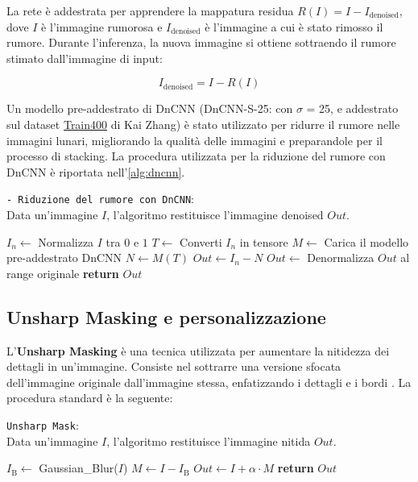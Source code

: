 La rete è addestrata per apprendere la mappatura residua $R(I) = I - I_{\text{denoised}}$, dove $I$ è l'immagine rumorosa e $I_{\text{denoised}}$ è l'immagine a cui è stato rimosso il rumore. Durante l'inferenza, la nuova immagine si ottiene sottraendo il rumore stimato dall'immagine di input:

$$I_{\text{denoised}} = I - R(I)$$

Un modello pre-addestrato di DnCNN (DnCNN-S-25: con $\sigma$ = 25, e addestrato sul dataset \href{https://github.com/cszn/KAIR}{Train400} di Kai Zhang) è stato utilizzato per ridurre il rumore nelle immagini lunari, migliorando la qualità delle immagini e preparandole per il processo di stacking. La procedura utilizzata per la riduzione del rumore con DnCNN è riportata nell'\cref{alg:dncnn}.

\begin{algorithm}[H]
    \caption{\texttt{- Riduzione del rumore con DnCNN}:\\ Data un'immagine $I$, l'algoritmo restituisce l'immagine denoised $Out$.} \label{alg:dncnn}
    \begin{algorithmic}[1]
            \State $I_n \gets$ Normalizza $I$ tra $0$ e $1$ 
            \State $T \gets$ Converti $I_n$ in tensore
            \State $M \gets$ Carica il modello pre-addestrato DnCNN
            \State $N \gets M(T)$ 
            \State $Out \gets I_n - N$ 
            \State $Out \gets$ Denormalizza $Out$ al range originale
            \State \textbf{return} $Out$
        \EndFunction
    \end{algorithmic}
\end{algorithm}

\subsection{Unsharp Masking e personalizzazione} \label{subsec:unsharp_mask}

L'\textbf{Unsharp Masking} è una tecnica utilizzata per aumentare la nitidezza dei dettagli in un'immagine. Consiste nel sottrarre una versione sfocata dell'immagine originale dall'immagine stessa, enfatizzando i dettagli e i bordi \cite{unsharp_mask_book}. La procedura standard è la seguente:

\begin{algorithm}[H]
    \caption{\texttt{Unsharp Mask}:\\ Data un'immagine $I$, l'algoritmo restituisce l'immagine nitida $Out$.} \label{alg:unsharp}
    \begin{algorithmic}
            \State $I_{\text{B}} \gets$ Gaussian\_Blur($I$) 
            \State $M \gets I - I_{\text{B}}$ 
            \State $Out \gets I + \alpha \cdot M$ 
            \State \textbf{return} $Out$
        \EndFunction
    \end{algorithmic}
\end{algorithm}


